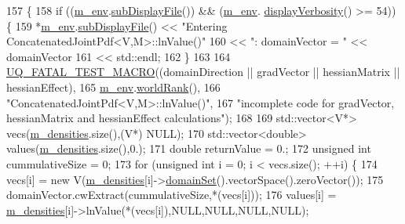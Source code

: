\begin{DoxyCode}
157 \{
158   \textcolor{keywordflow}{if} ((\hyperlink{class_q_u_e_s_o_1_1_base_scalar_function_adf44141aeb765d97613286f88f235f04}{m\_env}.\hyperlink{class_q_u_e_s_o_1_1_base_environment_a8a0064746ae8dddfece4229b9ad374d6}{subDisplayFile}()) && (\hyperlink{class_q_u_e_s_o_1_1_base_scalar_function_adf44141aeb765d97613286f88f235f04}{m\_env}.
      \hyperlink{class_q_u_e_s_o_1_1_base_environment_a1fe5f244fc0316a0ab3e37463f108b96}{displayVerbosity}() >= 54)) \{
159     *\hyperlink{class_q_u_e_s_o_1_1_base_scalar_function_adf44141aeb765d97613286f88f235f04}{m\_env}.\hyperlink{class_q_u_e_s_o_1_1_base_environment_a8a0064746ae8dddfece4229b9ad374d6}{subDisplayFile}() << \textcolor{stringliteral}{"Entering ConcatenatedJointPdf<V,M>::lnValue()"}
160                             << \textcolor{stringliteral}{": domainVector = "} << domainVector
161                             << std::endl;
162   \}
163 
164   \hyperlink{_defines_8h_a56d63d18d0a6d45757de47fcc06f574d}{UQ\_FATAL\_TEST\_MACRO}((domainDirection || gradVector || hessianMatrix || hessianEffect),
165                       \hyperlink{class_q_u_e_s_o_1_1_base_scalar_function_adf44141aeb765d97613286f88f235f04}{m\_env}.\hyperlink{class_q_u_e_s_o_1_1_base_environment_a78b57112bbd0e6dd0e8afec00b40ffa7}{worldRank}(),
166                       \textcolor{stringliteral}{"ConcatenatedJointPdf<V,M>::lnValue()"},
167                       \textcolor{stringliteral}{"incomplete code for gradVector, hessianMatrix and hessianEffect calculations"});
168 
169   std::vector<V*> vecs(\hyperlink{class_q_u_e_s_o_1_1_concatenated_joint_pdf_a42ee130daadf7ceb0d1745011f5b1169}{m\_densities}.size(),(V*) NULL);
170   std::vector<double> values(\hyperlink{class_q_u_e_s_o_1_1_concatenated_joint_pdf_a42ee130daadf7ceb0d1745011f5b1169}{m\_densities}.size(),0.);
171   \textcolor{keywordtype}{double} returnValue = 0.;
172   \textcolor{keywordtype}{unsigned} \textcolor{keywordtype}{int} cummulativeSize = 0;
173   \textcolor{keywordflow}{for} (\textcolor{keywordtype}{unsigned} \textcolor{keywordtype}{int} i = 0; i < vecs.size(); ++i) \{
174     vecs[i] = \textcolor{keyword}{new} V(\hyperlink{class_q_u_e_s_o_1_1_concatenated_joint_pdf_a42ee130daadf7ceb0d1745011f5b1169}{m\_densities}[i]->\hyperlink{class_q_u_e_s_o_1_1_base_scalar_function_ad0937628825249dd36ded3ce0c7959ac}{domainSet}().vectorSpace().zeroVector());
175     domainVector.cwExtract(cummulativeSize,*(vecs[i]));
176     values[i] = \hyperlink{class_q_u_e_s_o_1_1_concatenated_joint_pdf_a42ee130daadf7ceb0d1745011f5b1169}{m\_densities}[i]->lnValue(*(vecs[i]),NULL,NULL,NULL,NULL);

\end{DoxyCode}
